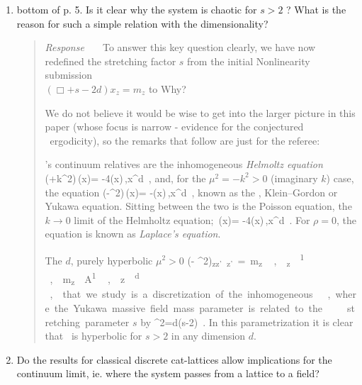 \documentclass[12pt]{iopart}
\begin{document}
\begin{enumerate}
  \item[(1)]
bottom of p. 5. Is it clear why the system is chaotic for
    $s > 2$ ?
    What is the reason for such a simple relation with the
    dimensionality?

\begin{quote}
{\em Response~~~}
To answer this key question clearly,
we have now redefined the stretching factor $s$ from the initial
Nonlinearity submission\\
  $(\Box + s - 2d) x_z = m_z$  to
\beq
{}
Why?

We do not believe it would be wise to get into the larger picture in this
paper (whose focus is narrow - evidence for the conjectured \catlatt\
ergodicity), so the remarks that follow are just for the referee:

\catLatt's continuum relatives are
the inhomogeneous \emph{Helmoltz equation}
\beq
   (\Box+k^2)\,\field(x)= -4\pi\rho(x)\,,\qquad x\in \reals^d
\,,
\label{CatMapContinuesPC}
\eeq
and, for
the ${\mu}^2=-k^2>0$ (imaginary $k$) case, the equation
\beq
   (\Box-{\mu}^2)\,\field(x)= -\rho(x)\,,\qquad x\in \reals^d
\,,
\label{sPe}
\eeq
known as  the
{\sPe}, Klein–Gordon or Yukawa equation.
Sitting between the two is
 the Poisson equation, the $k \to 0$ limit of the Helmholtz equation;
\beq
   \Box\,\field(x)= -4\pi\rho(x)\,,\qquad x\in \reals^d
\,.
For $\rho=0$, the equation is known as \emph{Laplace's equation}.

The $d$\dmn, purely hyperbolic ${\mu}^2>0$
{\catlatt} 
\beq
 (\Box - {\mu}^2\unit)_{zz'} \field_{z'} = \m_z
    \,, \qquad
  \field_{z} \in  {}^{1}
    \,, \quad
  m_{z} \in \A^{1}
    \,, \quad
  z\in \integers^{d}
\,,
that we study is a discretization of the inhomogeneous {\sPe}
,
where the Yukawa massive field mass parameter is related to the \catlatt\
 stretching parameter ${s}$ by
\beq
{\mu}^2=d(s-2)
\,.
In this parametrization it is clear
that \catlatt\ is hyperbolic for $s>2$ in any dimension $d$.
\end{quote}

  \item[(2.a)]
Do the results for classical discrete cat-lattices allow implications for
the continuum limit, ie. where the system passes from a lattice to a
field?


\end{enumerate}
\end{document}
